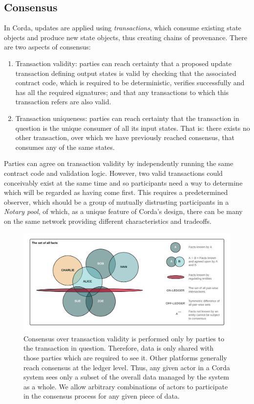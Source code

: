 \documentclass{article}
\begin{document}
\subsection{Consensus}
In Corda, updates are applied using \textit{transactions}, which consume existing state objects and produce new state objects, thus creating chains of provenance. There are two aspects of consensus:
\begin{enumerate}
\item{Transaction validity: parties can reach certainty that a proposed update transaction defining output states is valid by checking that the associated contract code, which is required to be deterministic, verifies successfully and has all the required signatures; and that any transactions to which this transaction refers are also valid.}
\item{Transaction uniqueness: parties can reach certainty that the transaction in question is the unique consumer of all its input states. That is: there exists no other transaction, over which we have previously reached consensus, that consumes any of the same states.}
\end{enumerate}

Parties can agree on transaction validity by independently running the same contract code and validation logic. However, two valid transactions could conceivably exist at the same time and so participants need a way to determine which will be regarded as having come first. This requires a predetermined observer, which should be a group of mutually distrusting participants in a \textit{Notary pool}, of which, as a unique feature of Corda's design, there can be many on the same network providing different characteristics and tradeoffs.

\begin{figure}[H]
    \includegraphics[scale = .5, center]{Consensus}
    \caption{Consensus over transaction validity is performed only by parties to the transaction in question. Therefore, data is only shared with those parties which are required to see it. Other platforms generally reach consensus at the ledger level. Thus, any given actor in a Corda system sees only a subset of the overall data managed by the system as a whole. We allow arbitrary combinations of actors to participate in the consensus process for any given piece of data.}
\end{figure}
\end{document}
